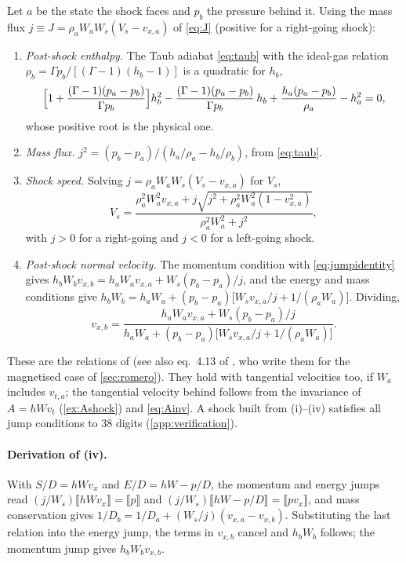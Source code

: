 \documentclass[11pt,a4paper,oneside,openany]{book}
\newcommand{\textcite}{\citet}
\theoremstyle{definition}
\theoremstyle{plain}
\theoremstyle{remark}
\newcommand{\jump}[1]{\llbracket #1\rrbracket}
\begin{document}
Let $a$ be the state the shock faces and $p_b$ the pressure behind it. Using the mass flux
$j\equiv J=\rho_aW_aW_s(V_s-v_{x,a})$ of \eqref{eq:J} (positive for a right-going shock):
\begin{enumerate}[label=(\roman*)]
\item \emph{Post-shock enthalpy.} The Taub adiabat \eqref{eq:taub} with the ideal-gas
  relation $\rho_b=\Gamma p_b/[(\Gamma-1)(h_b-1)]$ is a quadratic for $h_b$,
  \begin{equation}\label{eq:taubquad}
  \Bigl[1+\frac{(\Gamma-1)(p_a-p_b)}{\Gamma p_b}\Bigr]h_b^2
  -\frac{(\Gamma-1)(p_a-p_b)}{\Gamma p_b}\,h_b
  +\frac{h_a(p_a-p_b)}{\rho_a}-h_a^2=0,
  \end{equation}
  whose positive root is the physical one.
\item \emph{Mass flux.} $j^2=(p_b-p_a)/(h_a/\rho_a-h_b/\rho_b)$, from \eqref{eq:taub}.
\item \emph{Shock speed.} Solving $j=\rho_aW_aW_s(V_s-v_{x,a})$ for $V_s$,
  \begin{equation}\label{eq:Vsj}
  V_s=\frac{\rho_a^2W_a^2v_{x,a}+j\sqrt{j^2+\rho_a^2W_a^2(1-v_{x,a}^2)}}{\rho_a^2W_a^2+j^2},
  \end{equation}
  with $j>0$ for a right-going and $j<0$ for a left-going shock.
\item \emph{Post-shock normal velocity.} The momentum condition with
  \eqref{eq:jumpidentity} gives $h_bW_bv_{x,b}=h_aW_av_{x,a}+W_s(p_b-p_a)/j$, and the energy
  and mass conditions give $h_bW_b=h_aW_a+(p_b-p_a)\bigl[W_sv_{x,a}/j+1/(\rho_aW_a)\bigr]$.
  Dividing,
  \begin{equation}\label{eq:vbshock}
  v_{x,b}=\frac{h_aW_av_{x,a}+W_s(p_b-p_a)/j}
  {h_aW_a+(p_b-p_a)\bigl[W_sv_{x,a}/j+1/(\rho_aW_a)\bigr]} .
  \end{equation}
\end{enumerate}
These are the relations of \textcite{Pons2000} (see also eq.~4.13 of \textcite{Romero2005},
who write them for the magnetised case of \cref{sec:romero}). They hold with tangential
velocities too, if $W_a$ includes $v_{t,a}$; the tangential velocity behind follows from
the invariance of $A=hWv_t$ (\cref{ex:Ashock}) and \eqref{eq:Ainv}. A shock built from
(i)--(iv) satisfies all jump conditions to 38 digits (\cref{app:verification}).

\paragraph{Derivation of (iv).} With $S/D=hWv_x$ and $E/D=hW-p/D$, the momentum and energy
jumps read $(j/W_s)\jump{hWv_x}=\jump{p}$ and $(j/W_s)\jump{hW-p/D}=\jump{pv_x}$, and mass
conservation gives $1/D_b=1/D_a+(W_s/j)(v_{x,a}-v_{x,b})$. Substituting the last relation
into the energy jump, the terms in $v_{x,b}$ cancel and $h_bW_b$ follows; the momentum jump
gives $h_bW_bv_{x,b}$.
\end{document}
